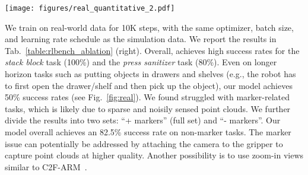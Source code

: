 \begin{figure*}[t!]
\centering
\texttt{[image: figures/real\_quantitative\_2.pdf]}
\caption{\textbf{Examples of \method in the real world.} A single \method model can perform multiple tasks (5 tasks, 13 variations) in the real world with just $\sim$10 demonstrations per task.}
\vspace{-3mm}
\label{fig:real}
\end{figure*}

We train on real-world data for 10K steps, with the same optimizer, batch size, and learning rate schedule as the simulation data. We report the results in Tab.~\ref{table:rlbench_ablation} (right). Overall, \method achieves high success rates for the \textit{stack block} task (100\%) and the \textit{press sanitizer} task (80\%). Even on longer horizon tasks such as putting objects in drawers and shelves (e.g., the robot has to first open the drawer/shelf and then pick up the object), our model achieves 50\% success rates (see Fig.~\ref{fig:real}). We found \method struggled with marker-related tasks, which is likely due to sparse and noisily sensed point clouds. We further divide the results into two sets: ``+ markers'' (full set) and ``- markers''. Our model overall achieves an 82.5\% success rate on non-marker tasks. The marker issue can potentially be addressed by attaching the camera to the gripper to capture point clouds at higher quality. Another possibility is to use zoom-in views similar to C2F-ARM~\cite{c2farm}.